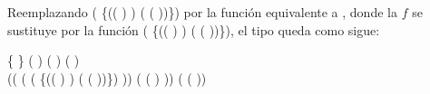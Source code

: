 Reemplazando  (\AgdaSymbol{$\lambda$} \{(( \AgdaInductiveConstructor{,} ) \AgdaInductiveConstructor{,} ) \AgdaSymbol{$\rightarrow$} ( \AgdaInductiveConstructor{,} ( \AgdaInductiveConstructor{,} ))\}) por la función equivalente a , donde la $f$ se sustituye por la función (\AgdaSymbol{$\lambda$} \{(( \AgdaInductiveConstructor{,} ) \AgdaInductiveConstructor{,} ) \AgdaSymbol{$\rightarrow$} ( \AgdaInductiveConstructor{,} ( \AgdaInductiveConstructor{,} ))\}), el tipo queda como sigue:
\begin{center}
\AgdaSymbol{$\forall$} \{ \AgdaSymbol{:} \} \AgdaSymbol{$\rightarrow$} ( \AgdaSymbol{:} ) ( \AgdaSymbol{:} ) ( \AgdaSymbol{:} ) \AgdaSymbol{$\rightarrow$} \\ ((\AgdaSymbol{$\lambda$}  \AgdaSymbol{$\rightarrow$}  \AgdaField{$\gg=$} (\AgdaSymbol{$\lambda$}  \AgdaSymbol{$\rightarrow$}  (\AgdaSymbol{$\lambda$} \{(( \AgdaInductiveConstructor{,} ) \AgdaInductiveConstructor{,} ) \AgdaSymbol{$\rightarrow$} ( \AgdaInductiveConstructor{,} ( \AgdaInductiveConstructor{,} ))\}) )) ( ( ) ))  (  ( ))
\end{center}

